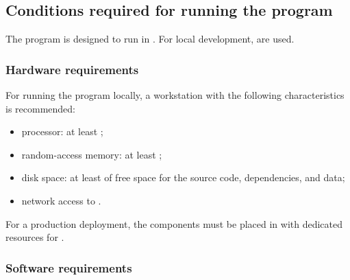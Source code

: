 \documentclass[12pt,a4paper]{extarticle}
\begin{document}
\subsection{Conditions required for running the program}

\begin{hseExample}
The program is designed to run in . For local development,  are used.
\end{hseExample}

\subsubsection{Hardware requirements}

\begin{hseExample}
For running the program locally, a workstation with the following characteristics is recommended:

\begin{itemize}[leftmargin=1.25cm]
    \item processor: at least ;
    \item random-access memory: at least ;
    \item disk space: at least  of free space for the source code, dependencies, and data;
    \item network access to .
\end{itemize}

For a production deployment, the components must be placed in  with dedicated resources for .
\end{hseExample}

\subsubsection{Software requirements}
\end{document}
